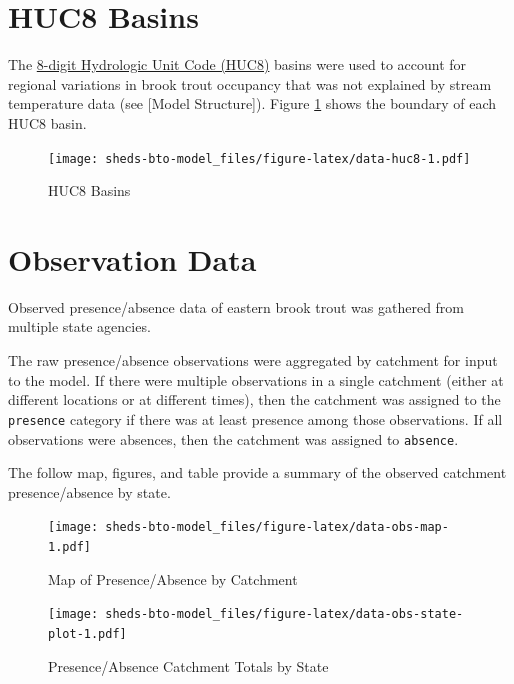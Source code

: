 \documentclass[
]{book}
\begin{document}
\hypertarget{huc8-basins}{%
\section{HUC8 Basins}\label{huc8-basins}}

The \href{https://water.usgs.gov/GIS/huc.html}{8-digit Hydrologic Unit Code (HUC8)} basins were used to account for regional variations in brook trout occupancy that was not explained by stream temperature data (see {[}Model Structure{]}). Figure \ref{fig:data-huc8} shows the boundary of each HUC8 basin.

\begin{figure}
\centering
\texttt{[image: sheds-bto-model\_files/figure-latex/data-huc8-1.pdf]}
\caption{\label{fig:data-huc8}HUC8 Basins}
\end{figure}

\hypertarget{observation-data}{%
\section{Observation Data}\label{observation-data}}

Observed presence/absence data of eastern brook trout was gathered from multiple state agencies.

The raw presence/absence observations were aggregated by catchment for input to the model. If there were multiple observations in a single catchment (either at different locations or at different times), then the catchment was assigned to the \texttt{presence} category if there was at least presence among those observations. If all observations were absences, then the catchment was assigned to \texttt{absence}.

The follow map, figures, and table provide a summary of the observed catchment presence/absence by state.

\begin{figure}
\centering
\texttt{[image: sheds-bto-model\_files/figure-latex/data-obs-map-1.pdf]}
\caption{\label{fig:data-obs-map}Map of Presence/Absence by Catchment}
\end{figure}

\begin{figure}
\centering
\texttt{[image: sheds-bto-model\_files/figure-latex/data-obs-state-plot-1.pdf]}
\caption{\label{fig:data-obs-state-plot}Presence/Absence Catchment Totals by State}
\end{figure}
\end{document}
